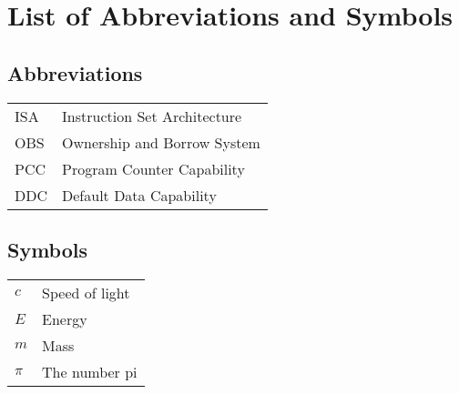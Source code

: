 \documentclass[master=cws,masteroption=vs]{kulemt}
\begin{document}
\chapter{List of Abbreviations and Symbols}
\section*{Abbreviations}
\begin{flushleft}
  \renewcommand{\arraystretch}{1.1}
  \begin{tabularx}{\textwidth}{@{}p{12mm}X@{}}
    ISA   & Instruction Set Architecture \\
    OBS   & Ownership and Borrow System \\
    PCC   & Program Counter Capability \\
    DDC   & Default Data Capability \\
  \end{tabularx}
\end{flushleft}
\section*{Symbols}
\begin{flushleft}
  \renewcommand{\arraystretch}{1.1}
  \begin{tabularx}{\textwidth}{@{}p{12mm}X@{}}
    $c$   & Speed of light \\
    $E$   & Energy \\
    $m$   & Mass \\
    $\pi$ & The number pi \\
  \end{tabularx}
\end{flushleft}

\mainmatter










\appendixpage*          %
\appendix



\backmatter


\end{document}
